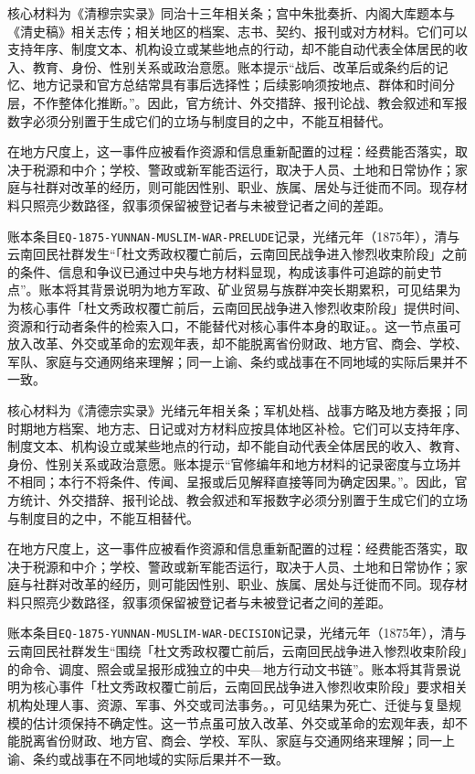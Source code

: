 核心材料为《清穆宗实录》同治十三年相关条；宫中朱批奏折、内阁大库题本与《清史稿》相关志传；相关地区的档案、志书、契约、报刊或对方材料。它们可以支持年序、制度文本、机构设立或某些地点的行动，却不能自动代表全体居民的收入、教育、身份、性别关系或政治意愿。账本提示“战后、改革后或条约后的记忆、地方记录和官方总结常具有事后选择性；后续影响须按地点、群体和时间分层，不作整体化推断。”。因此，官方统计、外交措辞、报刊论战、教会叙述和军报数字必须分别置于生成它们的立场与制度目的之中，不能互相替代。

在地方尺度上，这一事件应被看作资源和信息重新配置的过程：经费能否落实，取决于税源和中介；学校、警政或新军能否运行，取决于人员、土地和日常协作；家庭与社群对改革的经历，则可能因性别、职业、族属、居处与迁徙而不同。现存材料只照亮少数路径，叙事须保留被登记者与未被登记者之间的差距。

账本条目\texttt{EQ-1875-YUNNAN-MUSLIM-WAR-PRELUDE}记录，光绪元年（1875年），清与云南回民社群发生“「杜文秀政权覆亡前后，云南回民战争进入惨烈收束阶段」之前的条件、信息和争议已通过中央与地方材料显现，构成该事件可追踪的前史节点”。账本将其背景说明为地方军政、矿业贸易与族群冲突长期累积，可见结果为为核心事件「杜文秀政权覆亡前后，云南回民战争进入惨烈收束阶段」提供时间、资源和行动者条件的检索入口，不能替代对核心事件本身的取证。。这一节点虽可放入改革、外交或革命的宏观年表，却不能脱离省份财政、地方官、商会、学校、军队、家庭与交通网络来理解；同一上谕、条约或战事在不同地域的实际后果并不一致。

核心材料为《清德宗实录》光绪元年相关条；军机处档、战事方略及地方奏报；同时期地方档案、地方志、日记或对方材料应按具体地区补检。它们可以支持年序、制度文本、机构设立或某些地点的行动，却不能自动代表全体居民的收入、教育、身份、性别关系或政治意愿。账本提示“官修编年和地方材料的记录密度与立场并不相同；本行不将条件、传闻、呈报或后见解释直接等同为确定因果。”。因此，官方统计、外交措辞、报刊论战、教会叙述和军报数字必须分别置于生成它们的立场与制度目的之中，不能互相替代。

在地方尺度上，这一事件应被看作资源和信息重新配置的过程：经费能否落实，取决于税源和中介；学校、警政或新军能否运行，取决于人员、土地和日常协作；家庭与社群对改革的经历，则可能因性别、职业、族属、居处与迁徙而不同。现存材料只照亮少数路径，叙事须保留被登记者与未被登记者之间的差距。

账本条目\texttt{EQ-1875-YUNNAN-MUSLIM-WAR-DECISION}记录，光绪元年（1875年），清与云南回民社群发生“围绕「杜文秀政权覆亡前后，云南回民战争进入惨烈收束阶段」的命令、调度、照会或呈报形成独立的中央—地方行动文书链”。账本将其背景说明为核心事件「杜文秀政权覆亡前后，云南回民战争进入惨烈收束阶段」要求相关机构处理人事、资源、军事、外交或司法事务。，可见结果为死亡、迁徙与复垦规模的估计须保持不确定性。这一节点虽可放入改革、外交或革命的宏观年表，却不能脱离省份财政、地方官、商会、学校、军队、家庭与交通网络来理解；同一上谕、条约或战事在不同地域的实际后果并不一致。

